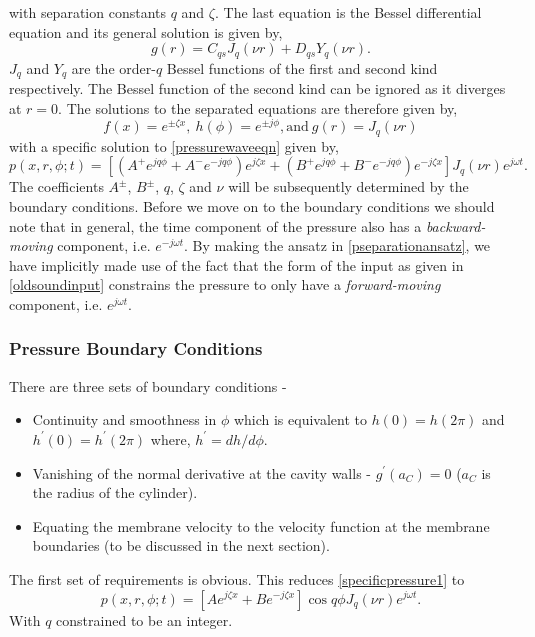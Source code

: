 with separation constants $q$ and $\zeta$. The last equation is the Bessel differential equation \cite[p.~313]{copsonbessel} and its general solution is given by,
\begin{equation}
 g(r)=C_{qs}J_q(\nu r)+D_{qs}Y_q(\nu r).
\end{equation}
$J_q$ and $Y_q$ are the order-$q$ Bessel functions of the first and second kind respectively. The Bessel function of the second kind can be ignored as it diverges at $r=0$.
The solutions to the separated equations are therefore given by,
\begin{equation}
 f(x)=e^{\pm \zeta x},\ h(\phi)=e^{\pm j\phi},\text{and}\ g(r)=J_q(\nu r)
\end{equation}
with a specific solution to \eqref{pressurewaveeqn} given by,
\begin{equation}\label{specificpressure1}
 p(x,r,\phi;t)=\left[(A^+e^{jq\phi}+A^-e^{-jq\phi})e^{j\zeta x}+(B^+e^{jq\phi}+B^-e^{-jq\phi})e^{-j\zeta x}\right]J_q(\nu r)e^{j\omega t}.
\end{equation}
The coefficients $A^\pm$, $B^\pm$, $q$, $\zeta$ and $\nu$ will be subsequently determined by the boundary conditions. 
Before we move on to the boundary conditions we should note that in general, the time component of the pressure also has a \textit{backward-moving} component, i.e. $e^{-j\omega t}$. 
By making the ansatz in \eqref{pseparationansatz}, we have implicitly made use of the fact that the form of the input as given in \eqref{oldsoundinput} constrains the pressure to only have a \textit{forward-moving} component, i.e. $e^{j\omega t}$.  
\subsubsection{Pressure Boundary Conditions}\label{pressureboundaryconditions}
There are three sets of boundary conditions - 
\begin{itemize}
 \item Continuity and smoothness in $\phi$ which is equivalent to $h(0)=h(2\pi)$ and $h^\prime(0)=h^\prime(2\pi)$ where, $h^\prime=dh/d\phi$.
 \item Vanishing of the normal derivative at the cavity walls - $g^\prime(a_C)=0$ ($a_C$ is the radius of the cylinder).
 \item Equating the membrane velocity to the velocity function at the membrane boundaries (to be discussed in the next section).
\end{itemize}
The first set of requirements is obvious. This reduces \eqref{specificpressure1} to 
\begin{equation}\label{specificpressure2}
 p(x,r,\phi;t)=\left[Ae^{j\zeta x}+Be^{-j\zeta x}\right]\cos q\phi J_q(\nu r)e^{j\omega t}.
\end{equation}
With $q$ constrained to be an integer.

